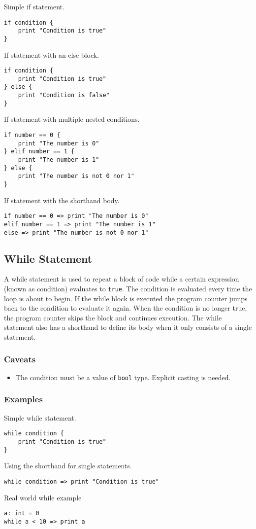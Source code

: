 Simple if statement.
\begin{lstlisting}
if condition {
    print "Condition is true"
}
\end{lstlisting}
If statement with an else block.
\begin{lstlisting}
if condition {
    print "Condition is true"
} else {
    print "Condition is false"
}
\end{lstlisting}
If statement with multiple nested conditions.
\begin{lstlisting}
if number == 0 {
    print "The number is 0"
} elif number == 1 {
    print "The number is 1"
} else {
    print "The number is not 0 nor 1"
}
\end{lstlisting}
If statement with the shorthand body.
\begin{lstlisting}
if number == 0 => print "The number is 0"
elif number == 1 => print "The number is 1"
else => print "The number is not 0 nor 1"
\end{lstlisting}

\subsection{While Statement}

A while statement is used to repeat a block of code while a certain expression (known as condition) evaluates to \texttt{true}.
The condition is evaluated every time the loop is about to begin. If the while block is executed the program counter jumps back
to the condition to evaluate it again. When the condition is no longer true, the program counter skips the block and continues execution.
The while statement also has a shorthand to define its body when it only consists of a single statement.

\subsubsection{Caveats}

\begin{itemize}
    \item The condition must be a value of \texttt{bool} type. Explicit casting is needed.
\end{itemize}

\subsubsection{Examples}

Simple while statement.
\begin{lstlisting}
while condition {
    print "Condition is true"
}
\end{lstlisting}
Using the shorthand for single statements.
\begin{lstlisting}
while condition => print "Condition is true"
\end{lstlisting}
Real world while example
\begin{lstlisting}
a: int = 0
while a < 10 => print a
\end{lstlisting}

